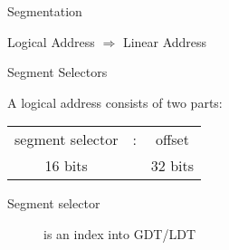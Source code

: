 \begin{frame}
  \begin{center}
  \end{center}
\end{frame}

\begin{frame}{Segmentation}
  \begin{iblock}{Logical Address $\Rightarrow$ Linear Address}
    \begin{center}
    \end{center}
  \end{iblock}
\end{frame}

\begin{frame}{Segment Selectors}
  \begin{iblock}{A logical address consists of two parts:}
    \begin{center}
      \begin{tabular}{ccc}
        segment selector&:&offset\\
        {\scriptsize 16 bits}&&{\scriptsize 32 bits}
      \end{tabular}
    \end{center}
  \end{iblock}
  \vspace{1em}
  \begin{description}
  \item[Segment selector] is an index into GDT/LDT
  \end{description}
    \begin{center}
    \end{center}
\end{frame}

